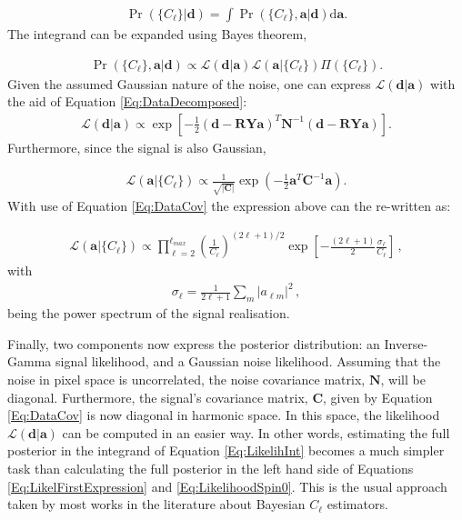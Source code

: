 \begin{align}
\Pr(\{C_{\ell}\}|\mathbf{d}) = \int\Pr(\{C_{\ell}\},\mathbf{a}|\mathbf{d})\text{d}\mathbf{a}.
\label{Eq:LikelihInt}
\end{align}
\noindent The integrand can be expanded using Bayes theorem,

\begin{align}
\Pr(\{C_{\ell}\},\mathbf{a}|\mathbf{d}) \propto \mathcal{L}(\mathbf{d}|\mathbf{a})\mathcal{L}(\mathbf{a}|\{C_{\ell}\})\Pi(\{C_{\ell}\}). 
\label{Eq:Posterior1}
\end{align}
\noindent Given the assumed Gaussian nature of the noise, one can express $\mathcal{L}(\mathbf{d}|\mathbf{a})$ with the aid of Equation \eqref{Eq:DataDecomposed}:
\begin{align}
\mathcal{L}(\mathbf{d}|\mathbf{a}) \propto \exp \left[ -\frac{1}{2} (\mathbf{d-RYa})^T \mathbf{N}^{-1}(\mathbf{d-RYa}) \right] .
\end{align}
\noindent Furthermore, since the signal is also Gaussian,

\begin{align}
\mathcal{L}(\mathbf{a}|\{C_{\ell}\}) \propto \frac{1}{\sqrt{|\mathbf{C}|}}\exp\left( -\frac{1}{2} \mathbf{a}^T\mathbf{C}^{-1}\mathbf{a}\right).
\end{align}
\noindent With use of Equation \eqref{Eq:DataCov} the expression above can the re-written as:

\begin{align}
\mathcal{L}(\mathbf{a}|\{C_{\ell}\}) \propto \prod_{{\ell}=2}^{{\ell}_{max}}\left(\frac{1}{C_{\ell}}\right)^{(2\ell+1)/2} \exp \left[ -\frac{(2\ell+1)}{2}\frac{\sigma_\ell}{C_{\ell}}\right]\, ,
\end{align}
\noindent with 
\begin{align}
\sigma_{\ell} = \frac{1}{2\ell+1}\sum_m|a_{\ell m}|^2 \, ,
\end{align}
\noindent being the power spectrum of the signal realisation.

\qquad Finally, two components now express the posterior distribution: an Inverse-Gamma signal likelihood, and a Gaussian noise likelihood. Assuming that the noise in pixel space is uncorrelated, the noise covariance matrix, $\mathbf{N}$, will be diagonal. Furthermore, the signal's covariance matrix, $\mathbf{C}$, given by Equation \eqref{Eq:DataCov} is now diagonal in harmonic space. In this space, the likelihood $ \mathcal{L}(\mathbf{d}|\mathbf{a} )$ can be computed in an easier way. In other words, estimating the full posterior in the integrand of Equation \eqref{Eq:LikelihInt} becomes a much simpler task than calculating the full posterior in the left hand side of Equations \eqref{Eq:LikelFirstExpression} and \eqref{Eq:LikelihoodSpin0}. This is the usual approach taken by most works in the literature about Bayesian $C_{\ell}$ estimators.


